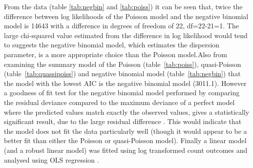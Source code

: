 From the data (table \ref{tab:negbin} and \ref{tab:poiss}) it can be seen that, twice the difference between log likelihoods of the  Poisson model and the negative binomial model is 14643 with a difference in degrees of freedom of 22, df=22-21=1. The large chi-squared value estimated from the difference in log likelihood would tend to suggests the negative binomial model, which estimates the dispersion parameter, is a more appropriate choice than the Poisson model.Also from examining the summary model of the Poisson (table~\ref{tab:poiss}), quasi-Poisson (table~\ref{tab:quassipoiss}) and negative binomial model (table~\ref{tab:negbin}) that the model with the lowest AIC is the negative binomial model (3011.1). However a goodness of fit test for the negative binomial model performed by comparing the residual deviance compared to the maximum deviance of a perfect model where the predicted values match exactly the observed values, gives a statistically significant result, due to the large residual difference . This would indicate that the model does not fit the data particularly well (though it would appear to be a better fit than either the Poisson or quasi-Poisson model). Finally a linear model (and a robust linear model) was fitted using log transformed count outcomes and analysed using OLS regression \citep{UCLAPoiss}.

